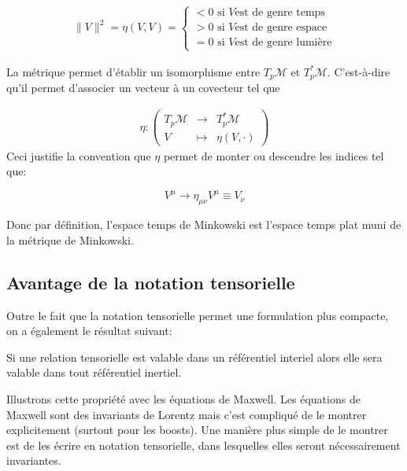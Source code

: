 \begin{align*}
    \lVert V \rVert ^2 = \eta (V, V) = \left\{
\begin{array}{l}
  < 0 \text{ si } V \text{est de genre temps} \\
  > 0 \text{ si } V \text{est de genre espace}\\
  = 0 \text{ si } V \text{est de genre lumière}
\end{array}
\right.
\end{align*}

La métrique permet d'établir un isomorphisme entre $T_{p}\mathcal{M} $ et $T^*_{p}\mathcal{M}$. C'est-à-dire qu'il permet d'associer un vecteur à un covecteur tel que

\begin{align*}
    \eta : \begin{pmatrix}
        T_{p}\mathcal{M} &\to & T^*_{p}\mathcal{M}\\
             V &\mapsto &\eta (V, \cdot)
    \end{pmatrix}
\end{align*}
Ceci justifie la convention que $\eta$ permet de monter ou descendre les indices tel que:

\begin{equation*}
    V^{\mu} \rightarrow \eta_{\mu \nu}V^{\mu} \equiv V_{\nu}
\end{equation*}

Donc par définition, l'espace temps de Minkowski est l'espace temps plat muni de la métrique de Minkowski. 

\subsection{Avantage de la notation tensorielle}
Outre le fait que la notation tensorielle permet une formulation plus compacte, on a également le résultat suivant:
\begin{theoremframe}
    \begin{prop}
        Si une relation tensorielle est valable dans un référentiel interiel alors elle sera valable dans tout référentiel inertiel.
    \end{prop}
\end{theoremframe}

Illustrons cette propriété avec les équations de Maxwell. Les équations de Maxwell sont des invariants de Lorentz mais c'est compliqué de le montrer explicitement (surtout pour les boosts). Une manière plus simple de le montrer est de les écrire en notation tensorielle, dans lesquelles elles seront nécessairement invariantes.


